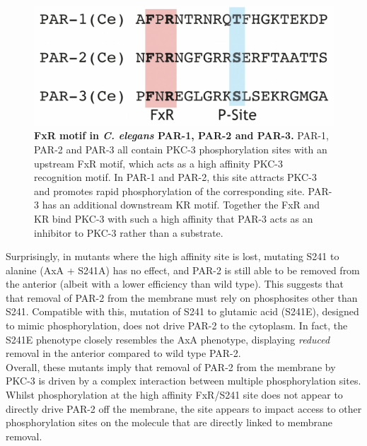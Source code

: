 \documentclass[12pt]{"report"}
\newcommand{\mycaption}[2]{\caption[#1]{\textbf{#1.} #2}}
\begin{document}
\begin{figure}
\includegraphics[scale=0.4]{fxr_sequence}
\centering
\mycaption{FxR motif in \textit{C. elegans} PAR-1, PAR-2 and PAR-3}{
PAR-1, PAR-2 and PAR-3 all contain PKC-3 phosphorylation sites with an upstream FxR motif, which acts as a high affinity PKC-3 recognition motif. In PAR-1 and PAR-2, this site attracts PKC-3 and promotes rapid phosphorylation of the corresponding site. PAR-3 has an additional downstream KR motif. Together the FxR and KR bind PKC-3 with such a high affinity that PAR-3 acts as an inhibitor to PKC-3 rather than a substrate.
}
\label{fig:fxr_sequence}
\end{figure}

Surprisingly, in mutants where the high affinity site is lost, mutating S241 to alanine (AxA + S241A) has no effect, and PAR-2 is still able to be removed from the anterior (albeit with a lower efficiency than wild type). This suggests that that removal of PAR-2 from the membrane must rely on phosphosites other than S241. Compatible with this, mutation of S241 to glutamic acid (S241E), designed to mimic phosphorylation, does not drive PAR-2 to the cytoplasm. In fact, the S241E phenotype closely resembles the AxA phenotype, displaying \textit{reduced} removal in the anterior compared to wild type PAR-2.\\

Overall, these mutants imply that removal of PAR-2 from the membrane by PKC-3 is driven by a complex interaction between multiple phosphorylation sites. Whilst phosphorylation at the high affinity FxR/S241 site does not appear to directly drive PAR-2 off the membrane, the site appears to impact access to other phosphorylation sites on the molecule that are directly linked to membrane removal. \\
\end{document}
